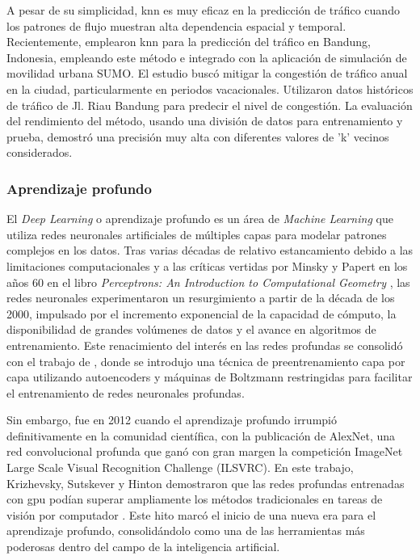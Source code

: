 A pesar de su simplicidad, \acrshort{knn} es muy eficaz en la predicción de tráfico cuando los patrones de flujo muestran alta dependencia espacial y temporal. Recientemente, \cite{forecastKnn} emplearon \acrshort{knn} para la predicción del tráfico en Bandung, Indonesia, empleando este método e integrado con la aplicación de simulación de movilidad urbana SUMO. El estudio buscó mitigar la congestión de tráfico anual en la ciudad, particularmente en periodos vacacionales. Utilizaron datos históricos de tráfico de Jl. Riau Bandung para predecir el nivel de congestión. La evaluación del rendimiento del método, usando una división de datos para entrenamiento y prueba, demostró una precisión muy alta con diferentes valores de 'k' vecinos considerados.

\subsubsection{Aprendizaje profundo}

El \textit{Deep Learning} o aprendizaje profundo es un área de \textit{Machine Learning} que utiliza redes neuronales artificiales de múltiples capas para modelar patrones complejos en los datos. Tras varias décadas de relativo estancamiento debido a las limitaciones computacionales y a las críticas vertidas por Minsky y Papert en los años 60 en el libro \textit{Perceptrons: An Introduction to Computational Geometry} \cite{minsky1969perceptrons}, las redes neuronales experimentaron un resurgimiento a partir de la década de los 2000, impulsado por el incremento exponencial de la capacidad de cómputo, la disponibilidad de grandes volúmenes de datos y el avance en algoritmos de entrenamiento. Este renacimiento del interés en las redes profundas se consolidó con el trabajo de \cite{hinton2006reducing}, donde se introdujo una técnica de preentrenamiento capa por capa utilizando autoencoders y máquinas de Boltzmann restringidas para facilitar el entrenamiento de redes neuronales profundas.

Sin embargo, fue en 2012 cuando el aprendizaje profundo irrumpió definitivamente en la comunidad científica, con la publicación de AlexNet, una red convolucional profunda que ganó con gran margen la competición ImageNet Large Scale Visual Recognition Challenge (ILSVRC). En este trabajo, Krizhevsky, Sutskever y Hinton demostraron que las redes profundas entrenadas con \acrlong{gpu} podían superar ampliamente los métodos tradicionales en tareas de visión por computador \cite{krizhevsky2012imagenet}. Este hito marcó el inicio de una nueva era para el aprendizaje profundo, consolidándolo como una de las herramientas más poderosas dentro del campo de la inteligencia artificial.

